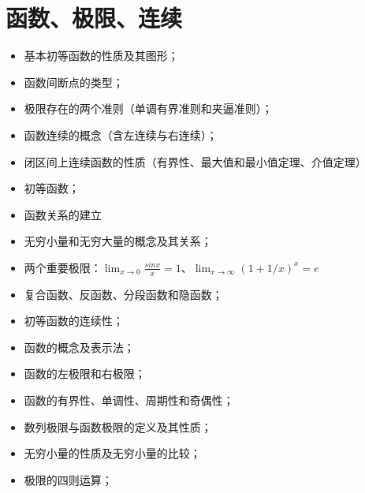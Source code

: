 \chapter{函数、极限、连续}
\begin{itemize}
\item 基本初等函数的性质及其图形；
\item 函数间断点的类型；
\item 极限存在的两个准则（单调有界准则和夹逼准则）；
\item 函数连续的概念（含左连续与右连续）；
\item 闭区间上连续函数的性质（有界性、最大值和最小值定理、介值定理）
\item 初等函数；
\item 函数关系的建立
\item 无穷小量和无穷大量的概念及其关系；
\item 两个重要极限：$\lim_{x\to 0} \frac{sinx}{x} = 1$、$\lim_{x\to \infty} (1+1/x)^x = e$
\item 复合函数、反函数、分段函数和隐函数；
\item 初等函数的连续性；
\item 函数的概念及表示法；
\item 函数的左极限和右极限；
\item 函数的有界性、单调性、周期性和奇偶性；
\item 数列极限与函数极限的定义及其性质；
\item 无穷小量的性质及无穷小量的比较；
\item 极限的四则运算；
\end{itemize}





